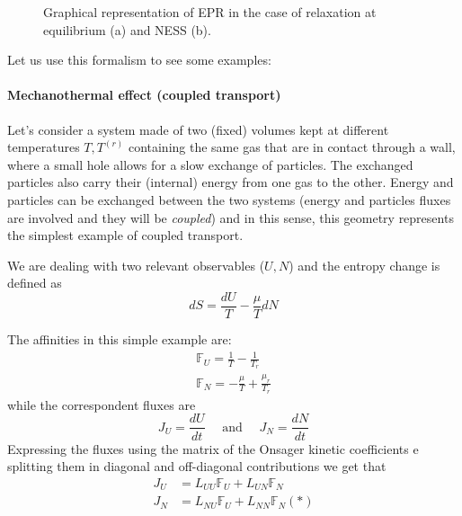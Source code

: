 \documentclass[\main/main.tex]{subfiles}
\begin{document}
\begin{figure}[ht]
		\centering
		 \quad
		\caption{Graphical representation of EPR in the case of relaxation at equilibrium (a) and NESS (b).}
		\label{fig:e}
	\end{figure}
	
Let us use this formalism to see some examples:
\paragraph{Mechanothermal effect (coupled transport)}

Let's consider a system made of two (fixed) volumes kept at different temperatures $T,T^{(r)}$ containing the
same gas that are in contact through a wall, where a small hole allows for a slow exchange
of particles. The exchanged particles also carry their (internal) energy from one gas to the
other. Energy and particles can be exchanged between the two systems (energy and particles fluxes are involved and they will be \textit{coupled}) and in this sense, this geometry represents the simplest example of coupled transport.

We are dealing with two relevant observables ($U,N$) and the entropy change is defined as
\begin{equation}
    dS=\frac{dU}{T}-\frac{\mu}{T}dN
\end{equation}

The affinities in this simple example are:
$$
\begin{array}{l}
\mathbb{F}_{U}=\frac{1}{T}-\frac{1}{T_{r}} \\
\mathbb{F}_{N}=-\frac{\mu}{T}+\frac{\mu_{r}}{T_{r}}
\end{array}
$$
while the correspondent fluxes are
\begin{equation}
J_{U}=\frac{d U}{d t} \quad \text { and } \quad J_{N}=\frac{d N}{d t}
\end{equation}
Expressing the fluxes using the matrix of the Onsager kinetic coefficients e splitting them in diagonal and off-diagonal contributions we get that 
\begin{equation}
\begin{aligned}
J_{U} &=L_{U U} \mathbb{F}_{U}+L_{U N} \mathbb{F}_{N} \\
J_{N} &=L_{N U} \mathbb{F}_{U}+L_{N N} \mathbb{F}_{N} (*)
\end{aligned}
\end{equation}
\end{document}
